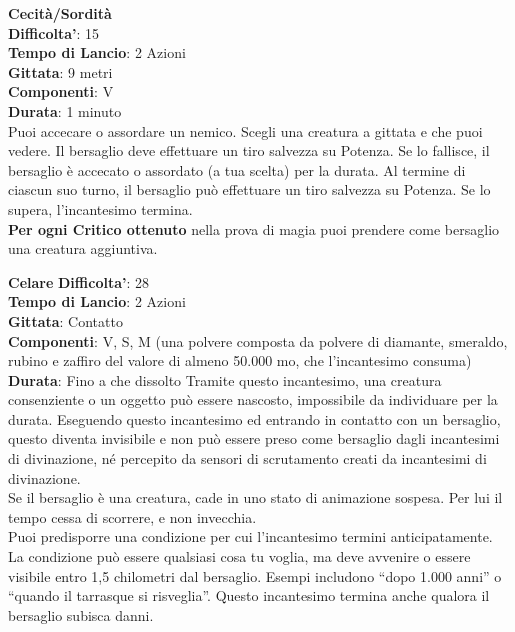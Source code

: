 \begin{multicols}{2}
\medskip\textbf{Cecità/Sordità}\\
\textbf{Difficolta'}: 15\\
\textbf{Tempo di Lancio}: 2 Azioni\\
\textbf{Gittata}: 9 metri\\
\textbf{Componenti}: V\\
\textbf{Durata}: 1 minuto\\
Puoi accecare o assordare un nemico. Scegli una creatura a gittata e che puoi vedere. Il bersaglio deve effettuare un tiro salvezza su Potenza. Se lo fallisce, il bersaglio è accecato o assordato (a tua scelta) per la durata. Al termine di ciascun suo turno, il bersaglio può effettuare un tiro salvezza su Potenza. Se lo supera, l’incantesimo termina.\\
\textbf{Per ogni Critico ottenuto} nella prova di magia puoi prendere come bersaglio una creatura aggiuntiva.

\medskip\textbf{Celare}
\textbf{Difficolta'}: 28\\
\textbf{Tempo di Lancio}: 2 Azioni\\
\textbf{Gittata}: Contatto\\
\textbf{Componenti}: V, S, M (una polvere composta da polvere di diamante, smeraldo, rubino e zaffiro del valore di almeno 50.000 mo, che l’incantesimo consuma)\\
\textbf{Durata}: Fino a che dissolto Tramite questo incantesimo, una creatura consenziente o un oggetto può essere nascosto, impossibile da individuare per la durata. Eseguendo questo incantesimo ed entrando in contatto con un bersaglio, questo diventa invisibile e non può essere preso come bersaglio dagli incantesimi di divinazione, né percepito da sensori di scrutamento creati da incantesimi di divinazione.\\
Se il bersaglio è una creatura, cade in uno stato di animazione sospesa. Per lui il tempo cessa di scorrere, e non invecchia. \\
Puoi predisporre una condizione per cui l’incantesimo termini anticipatamente. La condizione può essere qualsiasi cosa tu voglia, ma deve avvenire o essere visibile entro 1,5 chilometri dal bersaglio. Esempi includono “dopo 1.000 anni” o “quando il tarrasque si risveglia”. Questo incantesimo termina anche qualora il bersaglio subisca danni.



\end{multicols}
